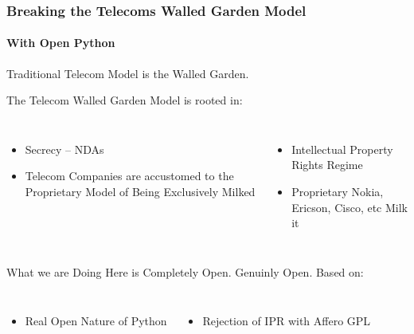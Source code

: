 \begin{verblatex}

\begin{frame}[fragile,plain,label=breakingWalledGarden]
    \frametitle{Breaking the Telecoms Walled Garden Model}
    \framesubtitle{With Open Python}

Traditional Telecom Model is the Walled Garden.

The Telecom Walled Garden Model is rooted in:

\bigskip

\begin{small}
\begin{columns}[T]

\begin{itemize}
  \item Secrecy -- NDAs
  \item Telecom Companies are accustomed to the Proprietary Model of Being Exclusively Milked
\end{itemize}


\begin{itemize}
  \item Intellectual Property Rights Regime
  \item Proprietary  Nokia, Ericson, Cisco, etc Milk it
\end{itemize}

\end{columns}
\end{small}

\bigskip


\begin{exampleblock}{What we are Doing Here is Completely Open.}
  Genuinly Open. Based on:
    \end{exampleblock}

\bigskip

\begin{columns}[T]

\begin{itemize}
  \item Real Open Nature of Python
\end{itemize}


\begin{itemize}
  \item Rejection of IPR with Affero GPL
\end{itemize}

\end{columns}



\end{frame}
\end{verblatex}
